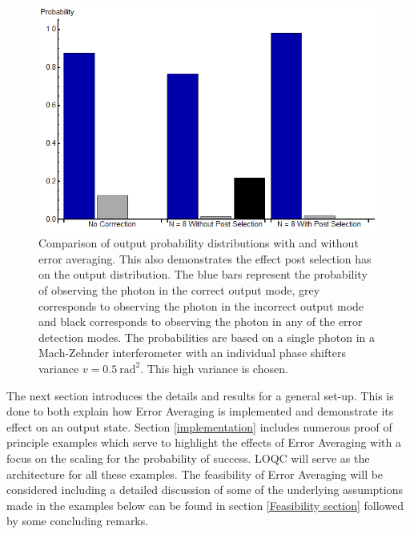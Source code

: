 \documentclass[aps,pra,twocolumn,superscriptaddress,numerical,floatfix]{revtex4-1}
\begin{document}
\begin{figure}
	\begin{centering}
		\includegraphics[width=\columnwidth]{prob_distributions.png}
	\end{centering}
	\caption[Comparison of output probability distributions with and without Error Averaging.]{Comparison of output probability distributions with and without error 	averaging. This also demonstrates the effect post selection has on the output distribution. The blue bars represent the probability of observing the photon in the correct output mode, grey corresponds to observing the photon in the incorrect output mode and black corresponds to observing the photon in any of the error detection modes. The probabilities are based on a single photon in a Mach-Zehnder interferometer with an individual phase shifters variance $v=0.5\ \textrm{rad}^{2}$. This high variance is chosen.} 
	\label{fig:output_probabilities}
\end{figure}

The next section introduces the details and results for a general set-up. This is done to both explain how Error Averaging is implemented and demonstrate its effect on an output state. Section \ref{implementation} includes numerous proof of principle examples which serve to highlight the effects of Error Averaging with a focus on the scaling for the probability of success. LOQC will serve as the architecture for all these examples. The feasibility of Error Averaging will be considered including a detailed discussion of some of the underlying assumptions made in the examples below can be found in section \ref{Feasibility section} followed by some concluding remarks.

\end{document}
